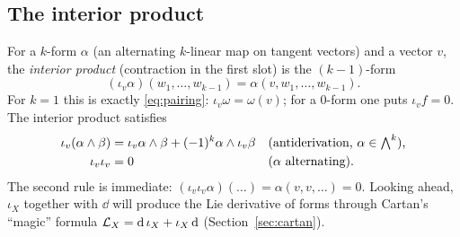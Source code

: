 \subsection{The interior product}\label{sec:interior}

For a $k$-form $\alpha$ (an alternating $k$-linear map on tangent vectors) and a vector $v$, the \emph{interior product} (contraction in the first slot) is the $(k-1)$-form
\begin{equation}\label{eq:interior}
(\iota_v\alpha)(w_1,\dots,w_{k-1})=\alpha(v,w_1,\dots,w_{k-1}).
\end{equation}
For $k=1$ this is exactly \eqref{eq:pairing}: $\iota_v\omega=\omega(v)$; for a $0$-form one puts $\iota_vf=0$.
The interior product satisfies
\begin{align}
\iota_v(\alpha\wedge\beta)&=\iota_v\alpha\wedge\beta+(-1)^k\alpha\wedge\iota_v\beta &&\text{(antiderivation, $\alpha\in\textstyle\bigwedge^k$),}\label{eq:antider}\\
\iota_v\iota_v&=0 &&\text{($\alpha$ alternating).}\notag
\end{align}
The second rule is immediate: $(\iota_v\iota_v\alpha)(\dots)=\alpha(v,v,\dots)=0$. Looking ahead, $\iota_X$ together with $\dd$ will
produce the Lie derivative of forms through Cartan's ``magic'' formula $\mathcal{L}_X=\mathrm{d}\,\iota_X+\iota_X\,\mathrm{d}$ (Section~\ref{sec:cartan}).

